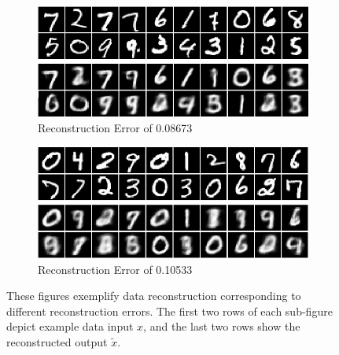 \documentclass[honours,12pt, twoside]{unswthesis}
\numberwithin{equation}{section}
\theoremstyle{definition}
\begin{document}
\begin{figure}[h!]
\begin{subfigure}{\textwidth}
\centering
\includegraphics[width=0.9\linewidth]{086729.png}
\caption{Reconstruction Error of 0.08673}
\end{subfigure}
\begin{subfigure}{\textwidth}
\centering
\includegraphics[width=0.9\linewidth]{105329.png}
\caption{Reconstruction Error of 0.10533}
\end{subfigure}
\caption{\small These figures exemplify data reconstruction corresponding to different reconstruction errors. The first two rows of each sub-figure depict example data input $x$, and the last two rows show the reconstructed output $\tilde{x}$.}
\end{figure}
\end{document}

